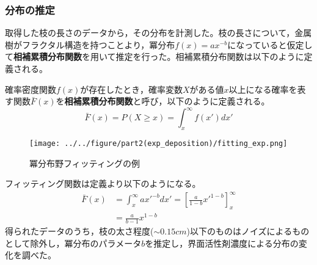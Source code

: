 \documentclass[autodetect-engine,dvi=dvipdfmx,a4paper,ja=standard,oneside,openany,11pt,draft]{bxjsarticle}
\begin{document}
\subsubsection{分布の推定}
取得した枝の長さのデータから，その分布を計測した。枝の長さについて，金属樹がフラクタル構造を持つことより，冪分布$f(x)=ax^{-b}$になっていると仮定して\textbf{相補累積分布関数}を用いて推定を行った。相補累積分布関数は以下のように定義される。
\begin{definition}
  確率密度関数$f(x)$が存在したとき，確率変数$X$がある値$x$以上になる確率を表す関数$\bar{F}(x)$を\textbf{相補累積分布関数}と呼び，以下のように定義される。
  \begin{equation}
    \bar{F}(x) = P(X \geq x) = \int_{x}^{\infty} f(x')dx'
  \end{equation}
\end{definition}
\begin{wrapfigure}{r}[0pt]{0.33\textwidth}
  \begin{center}
    \texttt{[image: ../../figure/part2(exp\_deposition)/fitting\_exp.png]}
  \end{center}
  \caption{冪分布野フィッティングの例}
  \label{fig:fitting_exp}
\end{wrapfigure}
フィッティング関数は定義より以下のようになる。
\begin{equation}
  \begin{split}
    \bar{F}(x) & = \int_{x}^{\infty} ax'^{-b}dx' = \left[ \frac{a}{1-b}x'^{1-b} \right]_{x}^{\infty} \\
               & = \frac{a}{b-1}x^{1-b}
  \end{split}
\end{equation}
得られたデータのうち，枝の太さ程度($\sim0.15\si{cm}$)以下のものはノイズによるものとして除外し，冪分布のパラメータ$b$を推定し，界面活性剤濃度による分布の変化を調べた。

\ifdraft{
  
  
}{}
\end{document}
